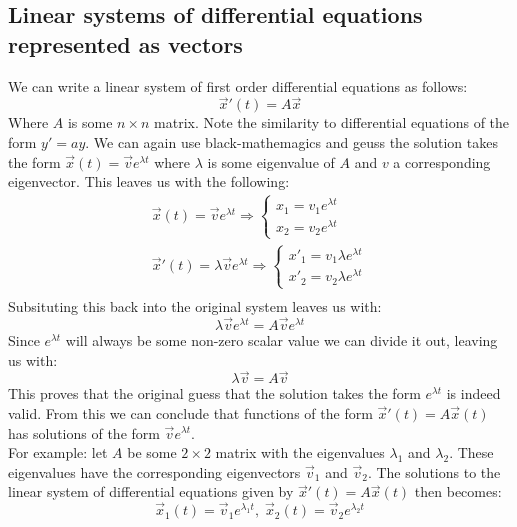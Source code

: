 \documentclass[11pt, a4paper]{article}
\begin{document}
\subsection{Linear systems of differential equations represented as vectors}
We can write a linear system of first order differential equations as follows:
\begin{equation*}
  \vec{x}'(t) = A\vec{x}
\end{equation*}
Where $A$ is some $n \times n$ matrix. Note the similarity to differential equations of the form $y' = ay$. We can again use black-mathemagics and geuss the solution takes the form $\vec{x}(t) = \vec{v}e^{\lambda t}$ where $\lambda$ is some eigenvalue of $A$ and $v$ a corresponding eigenvector. This leaves us with the following:
\begin{gather*}
  \vec{x}(t) = \vec{v}e^{\lambda t} \Rightarrow
  \begin{cases}
    x_1 = v_1 e^{\lambda t}\\
    x_2 = v_2 e^{\lambda t}
  \end{cases}\\
  \vec{x}'(t) = \lambda\vec{v}e^{\lambda t} \Rightarrow
  \begin{cases}
    x'_1 = v_1 \lambda e^{\lambda t}\\
    x'_2 = v_2 \lambda e^{\lambda t}
  \end{cases}\\
\end{gather*}
Subsituting this back into the original system leaves us with:
\begin{equation*}
  \lambda \vec{v} e^{\lambda t} = A\vec{v}e^{\lambda t}
\end{equation*}
Since $e^{\lambda t}$ will always be some non-zero scalar value we can divide it out, leaving us with:
\begin{equation*}
  \lambda \vec{v} = A\vec{v}  
\end{equation*}
This proves that the original guess that the solution takes the form $e^{\lambda t}$ is indeed valid. From this we can conclude that functions of the form $\vec{x}'(t) = A\vec{x}(t)$ has solutions of the form $\vec{v}e^{\lambda t}$. \\
For example: let $A$ be some $2 \times 2$ matrix with the eigenvalues $\lambda_1$ and $\lambda_2$. These eigenvalues have the corresponding eigenvectors $\vec{v}_1$ and $\vec{v}_2$. The solutions to the linear system of differential equations given by $\vec{x}'(t) = A\vec{x}(t)$ then becomes:
\begin{equation*}
  \vec{x}_1(t) = \vec{v}_1e^{\lambda_1 t},\; \vec{x}_2(t) = \vec{v}_2e^{\lambda_2 t}
\end{equation*}
\end{document}
